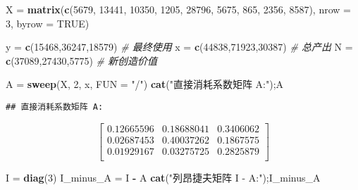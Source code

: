\documentclass[
]{article}
\author{}
\date{\vspace{-2.5em}}
\newenvironment{Shaded}{\begin{snugshade}}{\end{snugshade}}
\newcommand{\AttributeTok}[1]{\textcolor[rgb]{0.13,0.29,0.53}{#1}}
\newcommand{\CommentTok}[1]{\textcolor[rgb]{0.56,0.35,0.01}{\textit{#1}}}
\newcommand{\ConstantTok}[1]{\textcolor[rgb]{0.56,0.35,0.01}{#1}}
\newcommand{\DecValTok}[1]{\textcolor[rgb]{0.00,0.00,0.81}{#1}}
\newcommand{\FunctionTok}[1]{\textcolor[rgb]{0.13,0.29,0.53}{\textbf{#1}}}
\newcommand{\NormalTok}[1]{#1}
\newcommand{\OtherTok}[1]{\textcolor[rgb]{0.56,0.35,0.01}{#1}}
\newcommand{\SpecialCharTok}[1]{\textcolor[rgb]{0.81,0.36,0.00}{\textbf{#1}}}
\newcommand{\StringTok}[1]{\textcolor[rgb]{0.31,0.60,0.02}{#1}}
\begin{document}
\begin{Shaded}
\begin{Highlighting}[]
\NormalTok{X }\OtherTok{=} \FunctionTok{matrix}\NormalTok{(}\FunctionTok{c}\NormalTok{(}\DecValTok{5679}\NormalTok{, }\DecValTok{13441}\NormalTok{, }\DecValTok{10350}\NormalTok{, }
             \DecValTok{1205}\NormalTok{, }\DecValTok{28796}\NormalTok{, }\DecValTok{5675}\NormalTok{, }
             \DecValTok{865}\NormalTok{, }\DecValTok{2356}\NormalTok{, }\DecValTok{8587}\NormalTok{), }
            \AttributeTok{nrow =} \DecValTok{3}\NormalTok{, }\AttributeTok{byrow =} \ConstantTok{TRUE}\NormalTok{)}

\NormalTok{y }\OtherTok{=} \FunctionTok{c}\NormalTok{(}\DecValTok{15468}\NormalTok{,}\DecValTok{36247}\NormalTok{,}\DecValTok{18579}\NormalTok{)  }\CommentTok{\# 最终使用}
\NormalTok{x }\OtherTok{=} \FunctionTok{c}\NormalTok{(}\DecValTok{44838}\NormalTok{,}\DecValTok{71923}\NormalTok{,}\DecValTok{30387}\NormalTok{)  }\CommentTok{\# 总产出}
\NormalTok{N }\OtherTok{=} \FunctionTok{c}\NormalTok{(}\DecValTok{37089}\NormalTok{,}\DecValTok{27430}\NormalTok{,}\DecValTok{5775}\NormalTok{)   }\CommentTok{\# 新创造价值}

\NormalTok{A }\OtherTok{=} \FunctionTok{sweep}\NormalTok{(X, }\DecValTok{2}\NormalTok{, x, }\AttributeTok{FUN =} \StringTok{"/"}\NormalTok{)}
\FunctionTok{cat}\NormalTok{(}\StringTok{"直接消耗系数矩阵 A:"}\NormalTok{);A}
\end{Highlighting}
\end{Shaded}

\begin{verbatim}
## 直接消耗系数矩阵 A:
\end{verbatim}

$$\begin{bmatrix}
0.12665596 & 0.18688041 & 0.3406062 \\
0.02687453 & 0.40037262 & 0.1867575 \\
0.01929167 & 0.03275725 & 0.2825879 \\
\end{bmatrix}$$

\begin{Shaded}
\begin{Highlighting}[]
\NormalTok{I }\OtherTok{=} \FunctionTok{diag}\NormalTok{(}\DecValTok{3}\NormalTok{)}
\NormalTok{I\_minus\_A }\OtherTok{=}\NormalTok{ I }\SpecialCharTok{{-}}\NormalTok{ A}
\FunctionTok{cat}\NormalTok{(}\StringTok{"列昂捷夫矩阵 I {-} A:"}\NormalTok{);I\_minus\_A}
\end{Highlighting}
\end{Shaded}
\end{document}
